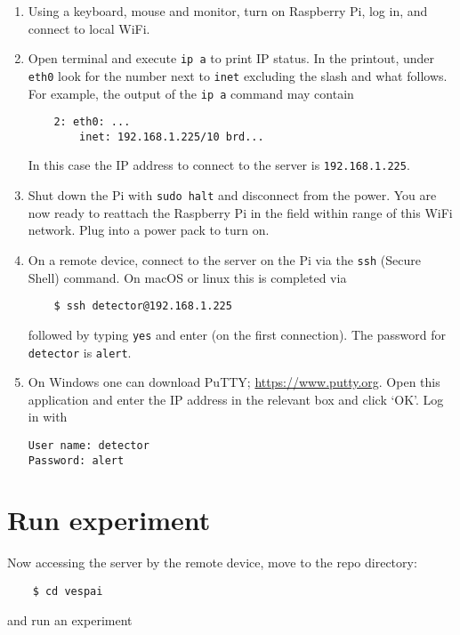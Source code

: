 \documentclass[12pt, a4paper, oneside]{article}
\begin{document}
\begin{enumerate}

\item
Using a keyboard, mouse and monitor, turn on Raspberry Pi, log in, and connect to local WiFi.

\item
Open terminal and execute \texttt{ip a} to print IP status. In the printout, under \texttt{eth0} look for the number next to \texttt{inet} excluding the slash and what follows. For example, the output of the \texttt{ip a} command may contain
\begin{verbatim}
	2: eth0: ...
		inet: 192.168.1.225/10 brd...
\end{verbatim}
In this case the IP address to connect to the server is \texttt{192.168.1.225}.

\item Shut down the Pi with \texttt{sudo halt} and disconnect from the power. You are now ready to reattach the Raspberry Pi in the field within range of this WiFi network. Plug into a power pack to turn on.

\item
On a remote device, connect to the server on the Pi via the \texttt{ssh} (Secure Shell) command. On macOS or linux this is completed via
\begin{verbatim}
	$ ssh detector@192.168.1.225
\end{verbatim}
followed by typing \texttt{yes} and enter (on the first connection). The password for \texttt{detector} is \texttt{alert}.

\item
On Windows one can download PuTTY; \url{https://www.putty.org}. Open this application and enter the IP address in the relevant box and click `OK'. Log in with
\begin{verbatim}
User name: detector
Password: alert
\end{verbatim}


\end{enumerate}

\section{Run experiment}

Now accessing the server by the remote device, move to the repo directory:
\begin{verbatim}
	$ cd vespai
\end{verbatim}
and run an experiment
\end{document}
